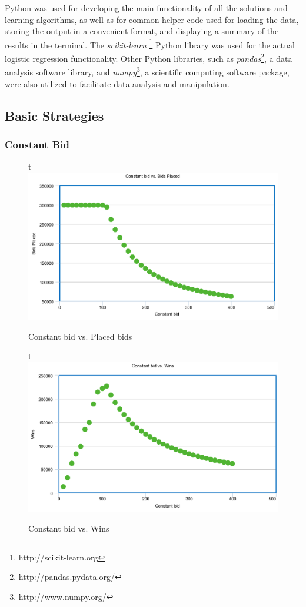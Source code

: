 \documentclass{sig-alternate-05-2015}
\begin{document}
Python was used for developing the main functionality of all the solutions and learning algorithms, as well as for common helper code used for loading the data, storing the output in a convenient format, and displaying a summary of the results in the terminal. The \textit{scikit-learn} \footnote{http://scikit-learn.org} Python library was used for the actual logistic regression functionality. Other Python libraries, such as \textit{pandas}\footnote{http://pandas.pydata.org/}, a data analysis software library, and \textit{numpy}\footnote{http://www.numpy.org/}, a scientific computing software package, were also utilized to facilitate data analysis and manipulation.

\subsection{Basic Strategies}

\subsubsection{Constant Bid}

\begin{figure}{t}
  \includegraphics[width=\linewidth]{constant_bids.png}
  \caption{Constant bid vs. Placed bids}
  \label{fig:bids}
\end{figure}

\begin{figure}{t}
  \includegraphics[width=\linewidth]{constant_wins.png}
  \caption{Constant bid vs. Wins}
  \label{fig:wins}
\end{figure}
\end{document}
